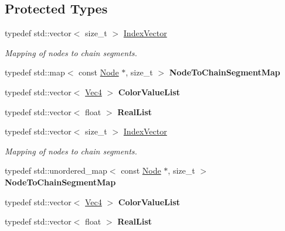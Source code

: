 \subsection*{Protected Types}
\begin{DoxyCompactItemize}
\item 
\mbox{\label{classPURibbonTrail_a3737804875a2e8ac5c038f9ed98f1924}} 
typedef std\+::vector$<$ size\+\_\+t $>$ \hyperlink{classPURibbonTrail_a3737804875a2e8ac5c038f9ed98f1924}{Index\+Vector}
\begin{DoxyCompactList}\small\item\em Mapping of nodes to chain segments. \end{DoxyCompactList}\item 
\mbox{\label{classPURibbonTrail_ac7733bc8055ecb0e30d3cae191aa7eab}} 
typedef std\+::map$<$ const \hyperlink{classNode}{Node} $\ast$, size\+\_\+t $>$ {\bfseries Node\+To\+Chain\+Segment\+Map}
\item 
\mbox{\label{classPURibbonTrail_ac0699399c080484de5f5e95e38246c98}} 
typedef std\+::vector$<$ \hyperlink{classVec4}{Vec4} $>$ {\bfseries Color\+Value\+List}
\item 
\mbox{\label{classPURibbonTrail_aaaa07534d7f79209abb2154f1b54542d}} 
typedef std\+::vector$<$ float $>$ {\bfseries Real\+List}
\item 
\mbox{\label{classPURibbonTrail_a3737804875a2e8ac5c038f9ed98f1924}} 
typedef std\+::vector$<$ size\+\_\+t $>$ \hyperlink{classPURibbonTrail_a3737804875a2e8ac5c038f9ed98f1924}{Index\+Vector}
\begin{DoxyCompactList}\small\item\em Mapping of nodes to chain segments. \end{DoxyCompactList}\item 
\mbox{\label{classPURibbonTrail_ab428b1ce272152b30b5f9f4de248b0bb}} 
typedef std\+::unordered\+\_\+map$<$ const \hyperlink{classNode}{Node} $\ast$, size\+\_\+t $>$ {\bfseries Node\+To\+Chain\+Segment\+Map}
\item 
\mbox{\label{classPURibbonTrail_ac0699399c080484de5f5e95e38246c98}} 
typedef std\+::vector$<$ \hyperlink{classVec4}{Vec4} $>$ {\bfseries Color\+Value\+List}
\item 
\mbox{\label{classPURibbonTrail_aaaa07534d7f79209abb2154f1b54542d}} 
typedef std\+::vector$<$ float $>$ {\bfseries Real\+List}
\end{DoxyCompactItemize}
